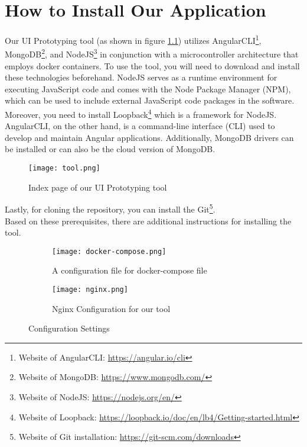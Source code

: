 \chapter{How to Install Our Application} 
\label{appendix:one:installation}
\ifpdf
    \graphicspath{{Appendix1/Figs/}{Appendix1/Figs/}{Appendix1/Figs/}}
\else
    \graphicspath{{Appendix1/Figs/}{Appendix1/Figs/}}
\fi
Our UI Prototyping tool (as shown in figure \ref{fig:appendix:installation:tool}) utilizes AngularCLI\footnote{Website of AngularCLI: \url{https://angular.io/cli}}, MongoDB\footnote{Website of MongoDB: \url{https://www.mongodb.com/}}, and NodeJS\footnote{Website of NodeJS: \url{https://nodejs.org/en/}} in conjunction with a microcontroller architecture that employs docker containers. 
To use the tool, you will need to download and install these technologies beforehand.
NodeJS serves as a runtime environment for executing JavaScript code and comes with the Node Package Manager (NPM), which can be used to include external JavaScript code packages in the software. 
Moreover, you need to install Loopback\footnote{Website of Loopback: \url{https://loopback.io/doc/en/lb4/Getting-started.html}} which is a framework for NodeJS.
AngularCLI, on the other hand, is a command-line interface (CLI) used to develop and maintain Angular applications. 
Additionally, MongoDB drivers can be installed or can also be the cloud version of MongoDB. 
\begin{figure}[htbp!]
	\centering    
	\texttt{[image: tool.png]}
	\caption[UI Prototyping tool]{Index page of our UI Prototyping tool}
	\label{fig:appendix:installation:tool}
\end{figure}
Lastly, for cloning the repository, you can install the Git\footnote{Website of Git installation: \url{https://git-scm.com/downloads}}.\\
Based on these prerequisites, there are additional instructions for installing the tool.

\begin{figure}[htbp]
	\begin{subfigure}[b]{0.55\textwidth}
	  \centering
	  \texttt{[image: docker-compose.png]}
	\caption[Docker configuration]{A configuration file for docker-compose file}
	\label{fig:appendix:installation:dockerCompose}   
	\end{subfigure}
	\begin{subfigure}[b]{0.55\textwidth}
	  \centering
	  \texttt{[image: nginx.png]}
	\caption[Nginx Configuration]{Nginx Configuration for our tool}
	\label{fig:appendix:installation:nginx}
	\end{subfigure} 
	\caption{Configuration Settings}
	\label{fig:appendix:configuration}
\end{figure}

